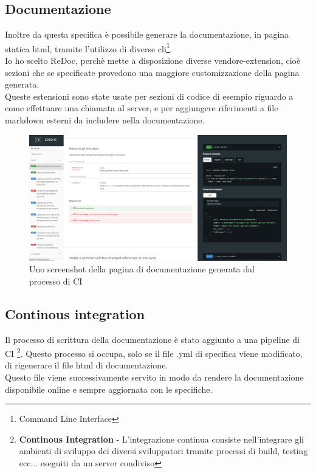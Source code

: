             \subsection{Documentazione\label{apidoc}}
                Inoltre da questa specifica è possibile generare la documentazione, in pagina statica html,
                tramite l'utilizzo di diverse cli\footnote{Command Line Interface}.\\
                Io ho scelto ReDoc, perchè mette a disposizione diverse vendore-extension, cioè sezioni che
                se specificate provedono una maggiore customizzazione della pagina generata.\\
                Queste estensioni sono state usate per sezioni di codice di esempio riguardo a come effettuare una chiamata al server, e per aggiungere riferimenti a file markdown esterni da includere nella documentazione.
                
                \begin{figure}[h]
                    \includegraphics[width=\textwidth]{images/documentation.png}
                    \caption{Uno screenshot della pagina di documentazione generata dal processo di CI}
                \end{figure}

            \subsection{Continous integration}
                Il processo di scrittura della documentazione è stato aggiunto a una pipeline di CI
                \footnote{\textbf{Continous Integration} - L'integrazione continua consiste nell'integrare gli ambienti di sviluppo dei diversi sviluppatori tramite processi di build, testing ecc... eseguiti da un server condiviso}.
                Questo processo si occupa, solo se il file .yml di specifica viene modificato, di 
                rigenerare il file html di documentazione.\\
                Questo file viene successivamente servito in modo da rendere la documentazione 
                disponibile online e sempre aggiornata con le specifiche.

